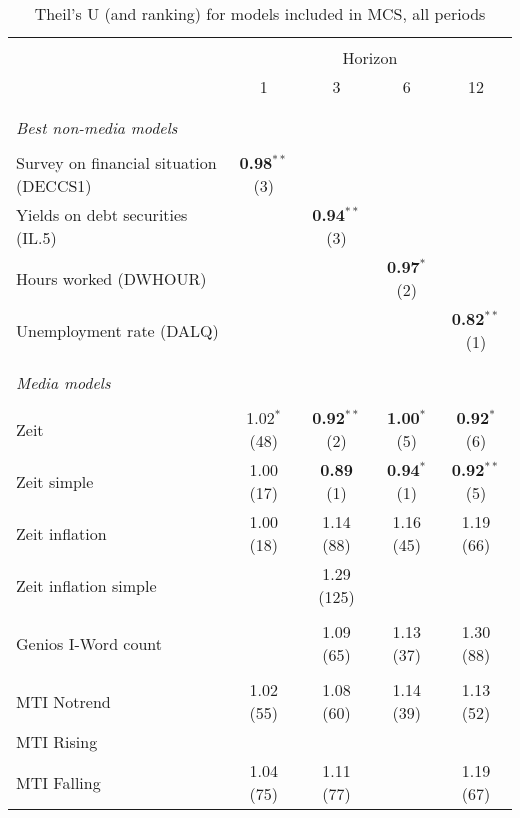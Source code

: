 
\begin{table}[!htbp] \centering 
  \caption{Theil's U (and ranking) for models included in MCS, all periods} 
  \label{} 
\scriptsize 
\begin{tabular}{@{\extracolsep{5pt}} lcccc} 
\\[-1.8ex]\hline 
\hline \\[-1.8ex] 
&\multicolumn{4}{c}{Horizon}\\
 & 1 & 3 & 6 & 12 \\ 
\hline \\[-1.8ex]
\multicolumn{5}{c}{}\\
\textit{Best non-media models} &  &  &  &\\
\multicolumn{5}{c}{}\\
Survey on financial situation (DECCS1) & \textbf{0.98$^{**}$} (3) &  &  &  \\ 
Yields on debt securities (IL.5) &  & \textbf{0.94$^{**}$} (3) &  &  \\ 
Hours worked (DWHOUR) &  &  & \textbf{0.97$^{*}$} (2) &  \\ 
Unemployment rate (DALQ) &  &  &  & \textbf{0.82$^{**}$} (1) \\ 
\hline \\[-1.8ex]
\multicolumn{5}{c}{}\\
\textit{Media models} &  &  &  &\\
\multicolumn{5}{c}{}\\
Zeit & 1.02$^{*}$ (48) & \textbf{0.92$^{**}$} (2) & \textbf{1.00$^{*}$} (5) & \textbf{0.92$^{*}$} (6) \\ 
Zeit simple & 1.00 (17) & \textbf{0.89} (1) & \textbf{0.94$^{*}$} (1) & \textbf{0.92$^{**}$} (5) \\ 
Zeit inflation & 1.00 (18) & 1.14 (88) & 1.16 (45) & 1.19 (66) \\ 
Zeit inflation simple &  & 1.29 (125) &  &  \\ 
\multicolumn{5}{c}{}\\
Genios I-Word count &  & 1.09 (65) & 1.13 (37) & 1.30 (88) \\ 
\multicolumn{5}{c}{}\\
MTI Notrend & 1.02 (55) & 1.08 (60) & 1.14 (39) & 1.13 (52) \\ 
MTI Rising &  &  &  &  \\ 
MTI Falling & 1.04 (75) & 1.11 (77) &  & 1.19 (67) \\ 

\end{tabular}
\end{table}
